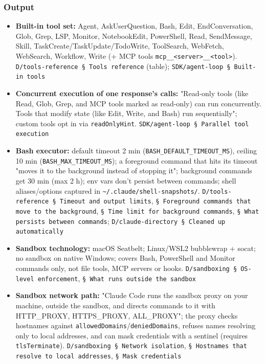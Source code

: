 \subsubsection*{Output}
\begin{itemize}
\item \textbf{Built-in tool set:} Agent, AskUserQuestion, Bash, Edit, EndConversation, Glob, Grep, LSP, Monitor, NotebookEdit, PowerShell, Read, SendMessage, Skill, TaskCreate/TaskUpdate/TodoWrite, ToolSearch, WebFetch, WebSearch, Workflow, Write (+ MCP tools \texttt{mcp\_\allowbreak{}\_\allowbreak{}<server>\_\allowbreak{}\_\allowbreak{}<tool>}). \texttt{D/\allowbreak{}tools-\allowbreak{}reference § Tools reference} (table); \texttt{SDK/\allowbreak{}agent-\allowbreak{}loop § Built-\allowbreak{}in tools}
\item \textbf{Concurrent execution of one response's calls:} "Read-only tools (like Read, Glob, Grep, and MCP tools marked as read-only) can run concurrently. Tools that modify state (like Edit, Write, and Bash) run sequentially"; custom tools opt in via \texttt{readOnlyHint}. \texttt{SDK/\allowbreak{}agent-\allowbreak{}loop § Parallel tool execution}
\item \textbf{Bash executor:} default timeout 2 min (\texttt{BASH\_\allowbreak{}DEFAULT\_\allowbreak{}TIMEOUT\_\allowbreak{}MS}), ceiling 10 min (\texttt{BASH\_\allowbreak{}MAX\_\allowbreak{}TIMEOUT\_\allowbreak{}MS}); a foreground command that hits its timeout "moves it to the background instead of stopping it"; background commands get 30 min (max 2 h); env vars don't persist between commands; shell aliases/options captured in \texttt{\textasciitilde{}/\allowbreak{}.\allowbreak{}claude/\allowbreak{}shell-\allowbreak{}snapshots/\allowbreak{}}. \texttt{D/\allowbreak{}tools-\allowbreak{}reference § Timeout and output limits}, \texttt{§ Foreground commands that move to the background}, \texttt{§ Time limit for background commands}, \texttt{§ What persists between commands}; \texttt{D/\allowbreak{}claude-\allowbreak{}directory § Cleaned up automatically}
\item \textbf{Sandbox technology:} macOS Seatbelt; Linux/WSL2 bubblewrap + socat; no sandbox on native Windows; covers Bash, PowerShell and Monitor commands only, not file tools, MCP servers or hooks. \texttt{D/\allowbreak{}sandboxing § OS-\allowbreak{}level enforcement}, \texttt{§ What runs outside the sandbox}
\item \textbf{Sandbox network path:} "Claude Code runs the sandbox proxy on your machine, outside the sandbox, and directs commands to it with HTTP\_PROXY, HTTPS\_PROXY, ALL\_PROXY"; the proxy checks hostnames against \texttt{allowedDomains}/\texttt{deniedDomains}, refuses names resolving only to local addresses, and can mask credentials with a sentinel (requires \texttt{tlsTerminate}). \texttt{D/\allowbreak{}sandboxing § Network isolation}, \texttt{§ Hostnames that resolve to local addresses}, \texttt{§ Mask credentials}

\end{itemize}
